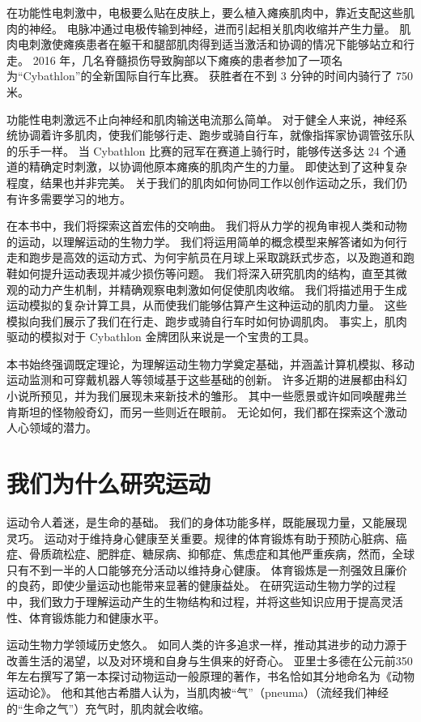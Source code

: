 在功能性电刺激中，电极要么贴在皮肤上，要么植入瘫痪肌肉中，靠近支配这些肌肉的神经。
电脉冲通过电极传输到神经，进而引起相关肌肉收缩并产生力量。
肌肉电刺激使瘫痪患者在躯干和腿部肌肉得到适当激活和协调的情况下能够站立和行走。
2016 年，几名脊髓损伤导致胸部以下瘫痪的患者参加了一项名为“Cybathlon”的全新国际自行车比赛。
获胜者在不到 3 分钟的时间内骑行了 750 米。


功能性电刺激远不止向神经和肌肉输送电流那么简单。
对于健全人来说，神经系统协调着许多肌肉，使我们能够行走、跑步或骑自行车，就像指挥家协调管弦乐队的乐手一样。
当 Cybathlon 比赛的冠军在赛道上骑行时，能够传送多达 24 个通道的精确定时刺激，以协调他原本瘫痪的肌肉产生的力量。
即使达到了这种复杂程度，结果也并非完美。
关于我们的肌肉如何协同工作以创作运动之乐，我们仍有许多需要学习的地方。


在本书中，我们将探索这首宏伟的交响曲。
我们将从力学的视角审视人类和动物的运动，以理解运动的生物力学。
我们将运用简单的概念模型来解答诸如为何行走和跑步是高效的运动方式、为何宇航员在月球上采取跳跃式步态，以及跑道和跑鞋如何提升运动表现并减少损伤等问题。
我们将深入研究肌肉的结构，直至其微观的动力产生机制，并精确观察电刺激如何促使肌肉收缩。
我们将描述用于生成运动模拟的复杂计算工具，从而使我们能够估算产生这种运动的肌肉力量。
这些模拟向我们展示了我们在行走、跑步或骑自行车时如何协调肌肉。
事实上，肌肉驱动的模拟对于 Cybathlon 金牌团队来说是一个宝贵的工具。


本书始终强调既定理论，为理解运动生物力学奠定基础，并涵盖计算机模拟、移动运动监测和可穿戴机器人等领域基于这些基础的创新。
许多近期的进展都由科幻小说所预见，并为我们展现未来新技术的雏形。
其中一些愿景或许如同唤醒弗兰肯斯坦的怪物般奇幻，而另一些则近在眼前。
无论如何，我们都在探索这个激动人心领域的潜力。






\section{我们为什么研究运动}

运动令人着迷，是生命的基础。
我们的身体功能多样，既能展现力量，又能展现灵巧。
运动对于维持身心健康至关重要。规律的体育锻炼有助于预防心脏病、癌症、骨质疏松症、肥胖症、糖尿病、抑郁症、焦虑症和其他严重疾病，然而，全球只有不到一半的人口能够充分活动以维持身心健康。
体育锻炼是一剂强效且廉价的良药，即使少量运动也能带来显著的健康益处。
在研究运动生物力学的过程中，我们致力于理解运动产生的生物结构和过程，并将这些知识应用于提高灵活性、体育锻炼能力和健康水平。


运动生物力学领域历史悠久。
如同人类的许多追求一样，推动其进步的动力源于改善生活的渴望，以及对环境和自身与生俱来的好奇心。
亚里士多德在公元前350年左右撰写了第一本探讨动物运动一般原理的著作，书名恰如其分地命名为《动物运动论》。
他和其他古希腊人认为，当肌肉被“气”（pneuma）（流经我们神经的“生命之气”）充气时，肌肉就会收缩。


